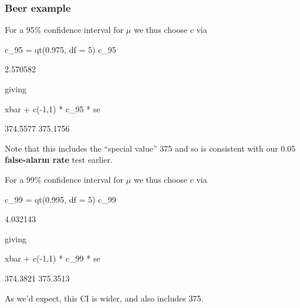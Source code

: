 \documentclass[a4paper]{article}
\begin{document}
\subsubsection{Beer example}
\begin{minipage}[t]{0.49\textwidth}
For a 95\% confidence interval for \( \mu \) we thus choose \( c \) via
\begin{Schunk}
\begin{Sinput}
c_95 = qt(0.975, df = 5)
c_95
\end{Sinput}
\begin{Soutput}
[1] 2.570582
\end{Soutput}
\end{Schunk}
giving
\begin{Schunk}
\begin{Sinput}
xbar + c(-1,1) * c_95 * se
\end{Sinput}
\begin{Soutput}
[1] 374.5577 375.1756
\end{Soutput}
\end{Schunk}
Note that this includes the ``special value'' 375 and so is consistent with our 0.05 \textcolor{mygreen}{\textbf{false-alarm rate}} test earlier.
\end{minipage}
\hspace{0.02\textwidth}
\begin{minipage}[t]{0.49\textwidth}
For a 99\% confidence interval for \( \mu \) we thus choose \( c \) via
\begin{Schunk}
\begin{Sinput}
c_99 = qt(0.995, df = 5)
c_99
\end{Sinput}
\begin{Soutput}
[1] 4.032143
\end{Soutput}
\end{Schunk}
giving
\begin{Schunk}
\begin{Sinput}
xbar + c(-1,1) * c_99 * se
\end{Sinput}
\begin{Soutput}
[1] 374.3821 375.3513
\end{Soutput}
\end{Schunk}
As we'd expect, this CI is wider, and also includes 375.
\end{minipage}
\end{document}
